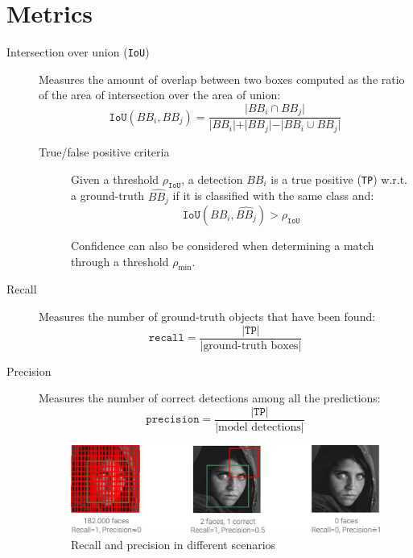 \section{Metrics}

\begin{description}
    \item[Intersection over union (\texttt{IoU})] 
        Measures the amount of overlap between two boxes computed as the ratio of the area of intersection over the area of union:
        \[ \texttt{IoU}(BB_i, BB_j) = \frac{\vert BB_i \cap BB_j \vert}{\vert BB_i \vert + \vert BB_j \vert - \vert BB_i \cup BB_j \vert} \]

        \begin{description}
            \item[True/false positive criteria] 
                Given a threshold $\rho_\texttt{IoU}$, a detection $BB_i$ is a true positive (\texttt{TP}) w.r.t. a ground-truth $\widehat{BB_j}$ if it is classified with the same class and:
                \[ \texttt{IoU}(BB_i, \widehat{BB_j}) > \rho_\texttt{IoU} \]

                \begin{remark}
                    Confidence can also be considered when determining a match through a threshold $\rho_\text{min}$.
                \end{remark}
        \end{description}

    \item[Recall]
        Measures the number of ground-truth objects that have been found:
        \[ \texttt{recall} = \frac{\vert \texttt{TP} \vert}{\vert \text{ground-truth boxes} \vert} \]

    \item[Precision]
        Measures the number of correct detections among all the predictions:
        \[ \texttt{precision} = \frac{\vert \texttt{TP} \vert}{\vert \text{model detections} \vert} \]

    \begin{figure}[H]
        \centering
        \includegraphics[width=0.7\linewidth]{./img/obj_det_recall_precision.jpg}
        \caption{
            Recall and precision in different scenarios
        }
    \end{figure}


\end{description}

